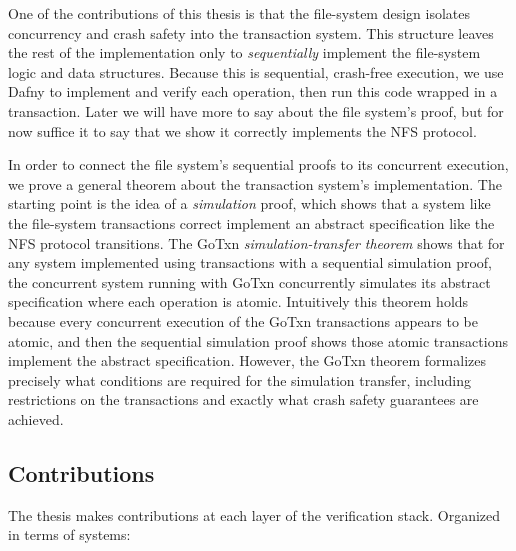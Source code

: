 One of the contributions of this thesis is that the file-system design isolates
concurrency and crash safety into the transaction system. This structure leaves
the rest of the implementation only to \emph{sequentially} implement the
file-system logic and data structures. Because this is sequential, crash-free
execution, we use Dafny to implement and verify each operation, then run this
code wrapped in a transaction. Later we will have more to say about the file
system's proof, but for now suffice it to say that we show it correctly
implements the NFS protocol.

In order to connect the file system's sequential proofs to its concurrent
execution, we prove a general theorem about the transaction system's
implementation. The starting point is the idea of a \emph{simulation} proof,
which shows that a system like the file-system transactions correct implement an
abstract specification like the NFS protocol transitions. The GoTxn
\emph{simulation-transfer theorem} shows that for any system implemented using
transactions with a sequential simulation proof, the concurrent system running
with GoTxn concurrently simulates its abstract specification where each
operation is atomic. Intuitively this theorem holds because every concurrent
execution of the GoTxn transactions appears to be atomic, and then the
sequential simulation proof shows those atomic transactions implement the
abstract specification. However, the GoTxn theorem formalizes precisely what
conditions are required for the simulation transfer, including restrictions on
the transactions and exactly what crash safety guarantees are achieved.

\subsection{Contributions}


The thesis makes contributions at each layer of the verification stack.
Organized in terms of systems:

